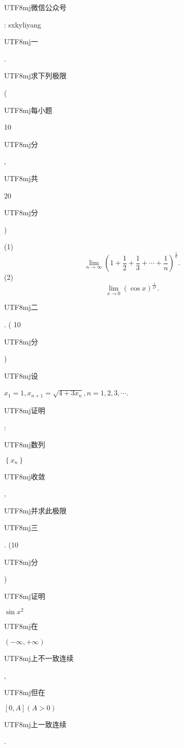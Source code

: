 \documentclass[10pt]{article}
\begin{document}
\begin{CJK}{UTF8}{mj}微信公众号\end{CJK}: sxkyliyang

\begin{CJK}{UTF8}{mj}一\end{CJK}. \begin{CJK}{UTF8}{mj}求下列极限\end{CJK} (\begin{CJK}{UTF8}{mj}每小题\end{CJK} 10 \begin{CJK}{UTF8}{mj}分\end{CJK}, \begin{CJK}{UTF8}{mj}共\end{CJK} 20 \begin{CJK}{UTF8}{mj}分\end{CJK})

(1)
$$
\lim _{n \rightarrow \infty}\left(1+\frac{1}{2}+\frac{1}{3}+\cdots+\frac{1}{n}\right)^{\frac{1}{n}} .
$$
(2)
$$
\lim _{x \rightarrow 0}(\cos x)^{\frac{1}{x^{2}}} .
$$
\begin{CJK}{UTF8}{mj}二\end{CJK}. ( 10 \begin{CJK}{UTF8}{mj}分\end{CJK}) \begin{CJK}{UTF8}{mj}设\end{CJK} $x_{1}=1, x_{n+1}=\sqrt{4+3 x_{n}}, n=1,2,3, \cdots$. \begin{CJK}{UTF8}{mj}证明\end{CJK}: \begin{CJK}{UTF8}{mj}数列\end{CJK} $\left\{x_{n}\right\}$ \begin{CJK}{UTF8}{mj}收敛\end{CJK}, \begin{CJK}{UTF8}{mj}并求此极限\end{CJK}

\begin{CJK}{UTF8}{mj}三\end{CJK}. (10 \begin{CJK}{UTF8}{mj}分\end{CJK}) \begin{CJK}{UTF8}{mj}证明\end{CJK} $\sin x^{2}$ \begin{CJK}{UTF8}{mj}在\end{CJK} $(-\infty,+\infty)$ \begin{CJK}{UTF8}{mj}上不一致连续\end{CJK}, \begin{CJK}{UTF8}{mj}但在\end{CJK} $[0, A](A>0)$ \begin{CJK}{UTF8}{mj}上一致连续\end{CJK}.
\end{document}
